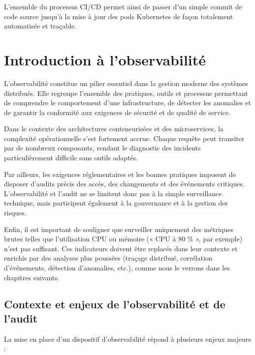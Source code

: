L’ensemble du processus CI/CD permet ainsi de passer d’un simple commit de code source jusqu’à la mise à jour des pods Kubernetes de façon totalement automatisée et traçable.

\section{Introduction à l’observabilité}

L’observabilité constitue un pilier essentiel dans la gestion moderne des systèmes distribués. Elle regroupe l’ensemble des pratiques, outils et processus permettant de comprendre le comportement d’une infrastructure, de détecter les anomalies et de garantir la conformité aux exigences de sécurité et de qualité de service.

Dans le contexte des architectures conteneurisées et des microservices, la complexité opérationnelle s’est fortement accrue. Chaque requête peut transiter par de nombreux composants, rendant le diagnostic des incidents particulièrement difficile sans outils adaptés.

Par ailleurs, les exigences réglementaires et les bonnes pratiques imposent de disposer d’audits précis des accès, des changements et des événements critiques. L’observabilité et l’audit ne se limitent donc pas à la simple surveillance technique, mais participent également à la gouvernance et à la gestion des risques.

Enfin, il est important de souligner que surveiller uniquement des métriques brutes telles que l’utilisation CPU ou mémoire (« CPU à 80 \% », par exemple) n’est pas suffisant. Ces indicateurs doivent être replacés dans leur contexte et enrichis par des analyses plus poussées (traçage distribué, corrélation d’événements, détection d’anomalies, etc.), comme nous le verrons dans les chapitres suivants.

\subsection{Contexte et enjeux de l'observabilité et de l'audit}

La mise en place d’un dispositif d’observabilité répond à plusieurs enjeux majeurs :

